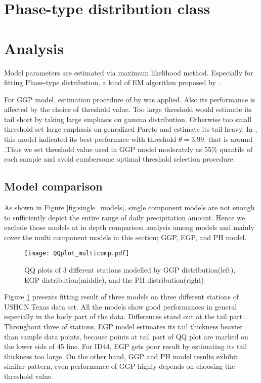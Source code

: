 \documentclass[12pt]{article}\usepackage[]{graphicx}\usepackage[]{color}
\begin{document}
\section{Phase-type distribution class}



\section{Analysis}


Model parameters are estimated via maximum likelihood method. Especially for fitting Phase-type distribution, a kind of EM algorithm proposed by \cite{asmussen1996fitting}. 

For GGP model, estimation procedure of by \cite{furrer2008improving} was applied. Also its performance is affected by the choice of threshold value. Too large threshold would estimate its tail short by taking large emphasis on gamma distribution. Otherwise too small threshold set large emphasis on genralized Pareto and estimate its tail heavy. In \cite{li2012simulation}, this model indicated its best performace with threshold $\theta = 3.99$, that is around .Thus we set threshold value used in GGP model moderately as 55\% quantile of each sample and avoid cumbersome optimal threshold selection procedure.


  \subsection{Model comparison}

As shown in Figure \ref{fig:single_models}, single component models are not enough to sufficiently depict the entire range of daily precipitation amount. Hence we exclude those models at in depth comparison analysis among models and mainly cover the multi component models in this section; GGP, EGP, and PH model. 


\begin{figure}
  \label{fig:multicomp}
  \centering
  \texttt{[image: QQplot\_multicomp.pdf]}
  \caption{QQ plots of 3 different stations modelled by GGP distribution(left), EGP distribution(middle), and the PH distribution(right)}
\end{figure}


Figure \ref{fig:multicomp} presents fitting result of three models on three different stations of USHCN Texas data set. All the models show good performances in general especially in the body part of the data. Differences stand out at the tail part. Throughout three of stations, EGP model estimates its tail thickness heavier than sample data points, because points at tail part of QQ plot are marked on the lower side of 45 \degree line. For ID44, EGP gets poor result by estimating its tail thickness too large. On the other hand, GGP and PH model results exhibit similar pattern, even performance of GGP highly depends on choosing the threshold value. 
\end{document}
